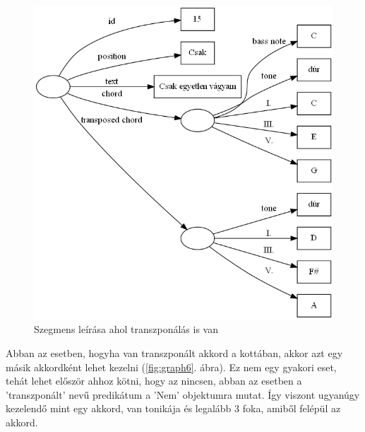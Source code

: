 \begin{figure}[h]
	\includegraphics[scale=0.6]{images/img_src/rdf_graph_5.png}
	\caption{Szegmens leírása ahol transzponálás is van}
	\label{fig:graph5}
\end{figure}

Abban az esetben, hogyha van transzponált akkord a kottában, akkor azt egy másik akkordként lehet kezelni (\ref{fig:graph6}. ábra). Ez nem egy gyakori eset, tehát lehet először ahhoz kötni, hogy az nincsen, abban az esetben a 'transzponált' nevű predikátum a 'Nem' objektumra mutat. Így viszont ugyanúgy kezelendő mint egy akkord, van tonikája és legalább 3 foka, amiből felépül az akkord.

